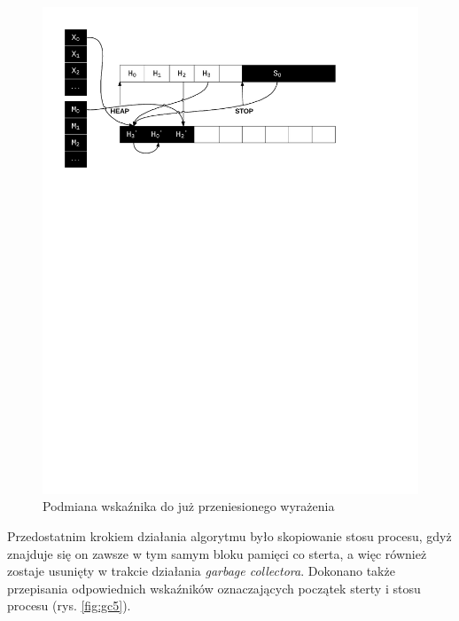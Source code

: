 \begin{figure}[h]
\centerline{\includegraphics[scale=0.75, clip, trim=10mm 185mm 45mm 10mm]{gc_4}}
\caption{Podmiana wskaźnika do już przeniesionego wyrażenia}
\label{fig:gc4}
\end{figure}

Przedostatnim krokiem działania algorytmu było skopiowanie stosu procesu, gdyż znajduje się on zawsze w tym samym bloku pamięci co sterta, a więc również zostaje usunięty w trakcie działania \emph{garbage collectora}.
Dokonano także przepisania odpowiednich wskaźników oznaczających początek sterty i stosu procesu (rys. \ref{fig:gc5}).

